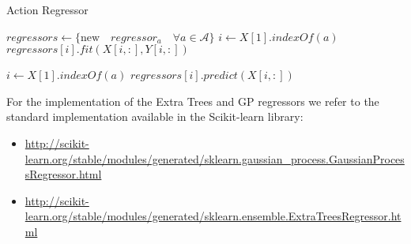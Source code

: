   \begin{algorithm}[H]
      \caption{Action Regressor}\label{actionalg}
      \begin{algorithmic}[1]
        \State $regressors \gets \{ \text{new} \quad regressor_{a} \quad \forall a \in \mathcal{A} \}$
            \State $i \gets X[1].indexOf(a)$
            \State $regressors[i].fit(X[i,:],Y[i,:])$
          \EndFor
        \EndProcedure

            \State $i \gets X[1].indexOf(a)$
            \State $regressors[i].predict(X[i,:])$
          \EndFor
        \EndProcedure
      \end{algorithmic}
  \end{algorithm}

  \noindent For the implementation of the Extra Trees and GP regressors we refer to the standard implementation
  available in the Scikit-learn \cite{scikit} library:
  \begin{itemize}
    \item \url{http://scikit-learn.org/stable/modules/generated/sklearn.gaussian_process.GaussianProcessRegressor.html}
    \item \url{http://scikit-learn.org/stable/modules/generated/sklearn.ensemble.ExtraTreesRegressor.html}
  \end{itemize}

  \blankpage
